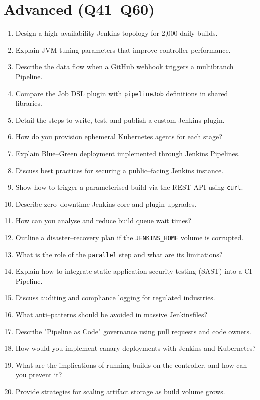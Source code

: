 \documentclass[12pt]{article}
\begin{document}
\section*{Advanced (Q41--Q60)}
\begin{enumerate}[label=\textbf{\arabic*.},start=41]
  \item Design a high--availability Jenkins topology for 2{,}000 daily builds.
  \item Explain JVM tuning parameters that improve controller performance.
  \item Describe the data flow when a GitHub webhook triggers a multibranch Pipeline.
  \item Compare the Job DSL plugin with \texttt{pipelineJob} definitions in shared libraries.
  \item Detail the steps to write, test, and publish a custom Jenkins plugin.
  \item How do you provision ephemeral Kubernetes agents for each stage?
  \item Explain Blue--Green deployment implemented through Jenkins Pipelines.
  \item Discuss best practices for securing a public--facing Jenkins instance.
  \item Show how to trigger a parameterised build via the REST API using \texttt{curl}.
  \item Describe zero--downtime Jenkins core and plugin upgrades.
  \item How can you analyse and reduce build queue wait times?
  \item Outline a disaster--recovery plan if the \texttt{JENKINS\_HOME} volume is corrupted.
  \item What is the role of the \texttt{parallel} step and what are its limitations?
  \item Explain how to integrate static application security testing (SAST) into a CI Pipeline.
  \item Discuss auditing and compliance logging for regulated industries.
  \item What anti--patterns should be avoided in massive Jenkinsfiles?
  \item Describe "Pipeline as Code" governance using pull requests and code owners.
  \item How would you implement canary deployments with Jenkins and Kubernetes?
  \item What are the implications of running builds on the controller, and how can you prevent it?
  \item Provide strategies for scaling artifact storage as build volume grows.
\end{enumerate}
\end{document}

